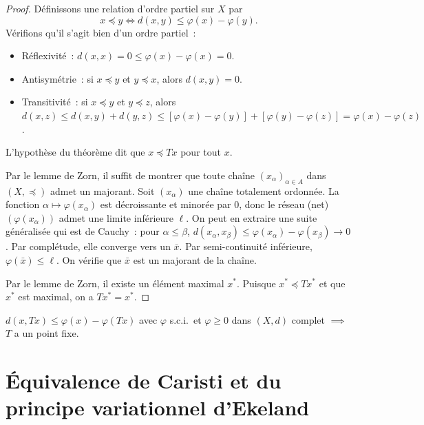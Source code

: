 \begin{proof}
D\'efinissons une relation d'ordre partiel sur $X$ par
\[
    x \preceq y \iff d(x, y) \leq \varphi(x) - \varphi(y).
\]
V\'erifions qu'il s'agit bien d'un ordre partiel~:
\begin{itemize}
    \item R\'eflexivit\'e~: $d(x,x) = 0 \leq \varphi(x) - \varphi(x) = 0$.
    \item Antisym\'etrie~: si $x \preceq y$ et $y \preceq x$, alors $d(x,y) = 0$.
    \item Transitivit\'e~: si $x \preceq y$ et $y \preceq z$, alors
          $d(x,z) \leq d(x,y) + d(y,z) \leq [\varphi(x) - \varphi(y)] + [\varphi(y) - \varphi(z)] = \varphi(x) - \varphi(z)$.
\end{itemize}

L'hypoth\`ese du th\'eor\`eme dit que $x \preceq Tx$ pour tout $x$.

Par le lemme de Zorn, il suffit de montrer que toute cha\^ine $(x_\alpha)_{\alpha \in A}$
dans $(X, \preceq)$ admet un majorant. Soit $(x_\alpha)$ une cha\^ine totalement
ordonn\'ee. La fonction $\alpha \mapsto \varphi(x_\alpha)$ est d\'ecroissante et
minor\'ee par $0$, donc le r\'eseau (net) $(\varphi(x_\alpha))$ admet une limite
inf\'erieure $\ell$. On peut en extraire une suite g\'en\'eralis\'ee qui est de Cauchy~:
pour $\alpha \leq \beta$,
$d(x_\alpha, x_\beta) \leq \varphi(x_\alpha) - \varphi(x_\beta) \to 0$.
Par compl\'etude, elle converge vers un $\bar{x}$. Par semi-continuit\'e
inf\'erieure, $\varphi(\bar{x}) \leq \ell$. On v\'erifie que $\bar{x}$ est un
majorant de la cha\^ine.

Par le lemme de Zorn, il existe un \'el\'ement maximal $x^*$. Puisque
$x^* \preceq Tx^*$ et que $x^*$ est maximal, on a $Tx^* = x^*$.
\end{proof}

\begin{formules}[title=\textbf{Condition de Caristi}]
$d(x, Tx) \leq \varphi(x) - \varphi(Tx)$ avec $\varphi$ s.c.i.\ et
$\varphi \geq 0$ dans $(X, d)$ complet $\implies$ $T$ a un point fixe.
\end{formules}

\section{\'Equivalence de Caristi et du principe variationnel d'Ekeland}

